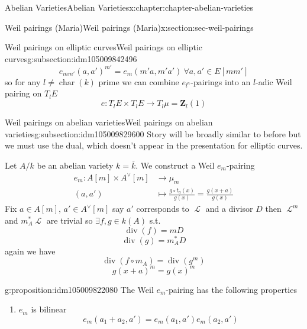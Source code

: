 \documentclass[oneside,10pt,]{book}
\numberwithin{equation}{section}
\newcommand{\sheaf}[1]{\operatorname{\mathcal{#1}}}
\newcommand{\lb}{[}
\newcommand{\rb}{]}
\newcommand{\ZZ}{\mathbf{Z}}
\DeclareMathOperator{\divisor}{div}
\DeclareMathOperator{\characteristic}{char}
\newcommand{\amp}{&}
\begin{document}
\begin{chapterptx}{Abelian Varieties}{}{Abelian Varieties}{}{}{x:chapter:chapter-abelian-varieties}
\begin{sectionptx}{Weil pairings (Maria)}{}{Weil pairings (Maria)}{}{}{x:section:sec-weil-pairings}
\begin{subsectionptx}{Weil pairings on elliptic curves}{}{Weil pairings on elliptic curves}{}{}{g:subsection:idm105009842496}
\begin{equation*}
e_{mm'} (a,a')^{m'} = e_m(m'a, m'a') \ \forall a,a' \in E[mm']
\end{equation*}
so for any \(l\ne \characteristic(k)\) prime we can combine \(e_{l^n}\)-pairings into an \(l\)-adic Weil pairing on \(T_l E\)%
\begin{equation*}
e \colon T_l E\times T_lE \to T_l \mu = \ZZ_l(1)
\end{equation*}
%
\end{subsectionptx}
%
%
\typeout{************************************************}
\typeout{************************************************}
%
\begin{subsectionptx}{Weil pairings on abelian varieties}{}{Weil pairings on abelian varieties}{}{}{g:subsection:idm105009829600}
Story will be broadly similar to before but we must use the dual, which doesn't appear in the presentation for elliptic curves.%
\par
Let \(A/k\) be an abelian variety \(k = \overline k\). We construct a Weil \(e_m\)-pairing%
\begin{align*}
e_m \colon A[m]\times A^\vee [m] \amp\to \mu_m\\
(a,a') \amp\mapsto \frac{g\circ t_a(x)}{g(x)} = \frac{g(x+a)}{g(x)}
\end{align*}
Fix \(a\in A\lb m\rb,\,a'\in A^\vee\lb m\rb\) say \(a'\) corresponds to \(\sheaf L\) and a divisor \(D\) then \(\sheaf L^m \) and \(m_A^* \sheaf L\) are trivial so \(\exists f,g \in k(A)\) s.t.%
\begin{equation*}
\divisor (f) = m D
\end{equation*}
%
\begin{equation*}
\divisor (g) = m_A^* D
\end{equation*}
again we have%
\begin{equation*}
\divisor( f\circ m_A) = \divisor (g^m)
\end{equation*}
%
\begin{equation*}
g(x+a)^m = g(x)^m
\end{equation*}
%
\begin{proposition}{}{}{g:proposition:idm105009822080}%
The Weil \(e_m\)-pairing has the following properties%
\begin{enumerate}
\item{}\(e_m\) is bilinear%
\begin{equation*}
e_m(a_1+a_2,a') = e_m(a_1,a')e_m(a_2, a')
\end{equation*}

\end{enumerate}
\end{proposition}
\end{subsectionptx}
\end{sectionptx}
\end{chapterptx}
\end{document}
